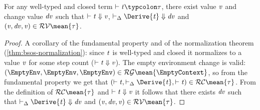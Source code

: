 \begin{corollary}
  \label{thm:bsos-derive-normalization}
For any well-typed and closed term \ensuremath{\vdash\Varid{t}\typcolon\tau}, there exist value \ensuremath{\Varid{v}} and
change value \ensuremath{\Varid{dv}} such that \ensuremath{\vdash\Varid{t}\;\negthickspace\Downarrow\negthickspace\;\Varid{v}}, \ensuremath{\vdash_{\Delta}\Derive{\Varid{t}}\;\negthickspace\Downarrow\negthickspace\;\Varid{dv}} and \ensuremath{(\Varid{v},\Varid{dv},\Varid{v})\in \mathcal{RV}\mean{\tau}}.
\end{corollary}
\begin{proof}
A corollary of the fundamental property and of the normalization theorem
(\cref{thm:bsos-normalization}): since \ensuremath{\Varid{t}} is well-typed and closed it
normalizes to a value \ensuremath{\Varid{v}} for some step count (\ensuremath{\vdash\Varid{t}\;\negthickspace\Downarrow\negthickspace\;\Varid{v}}).
The empty environment change is valid: \ensuremath{(\EmptyEnv,\EmptyEnv,\EmptyEnv)\in \mathcal{RG}\mean{\EmptyContext}}, so from the fundamental property we get that \ensuremath{(\vdash\Varid{t},\vdash_{\Delta}\Derive{\Varid{t}},\vdash\Varid{t})\in \mathcal{RC}\mean{\tau}}. From the definition of \ensuremath{\mathcal{RC}\mean{\tau}} and
\ensuremath{\vdash\Varid{t}\;\negthickspace\Downarrow\negthickspace\;\Varid{v}} it follows that there exists \ensuremath{\Varid{dv}} such that \ensuremath{\vdash_{\Delta}\Derive{\Varid{t}}\;\negthickspace\Downarrow\negthickspace\;\Varid{dv}} and \ensuremath{(\Varid{v},\Varid{dv},\Varid{v})\in \mathcal{RV}\mean{\tau}}.
\end{proof}
